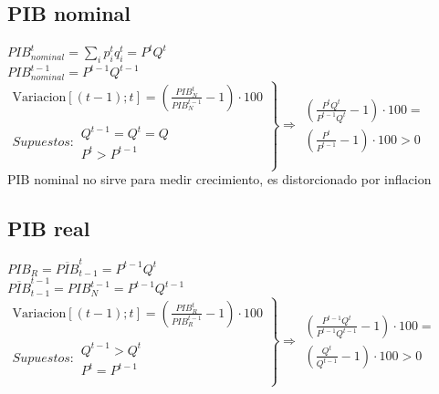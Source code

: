 \documentclass{report}
\begin{document}
\subsection{PIB nominal}
$PIB_{nominal}^t = \sum_{i}{p_i^t q_i^t} = P^t Q^t$ \\

$PIB_{nominal}^{t-1} = P^{t-1}Q^{t-1}$ \\

\(\left.
	\begin{array}{l}
		\text{Variacion}[(t-1);t] = (\frac{PIB_N^t}{PIB_N^{t-1}} - 1) \cdot 100 \\
		Supuestos: \begin{array}{l}           \\
			           Q^{t-1}=Q^t=Q \\
			           P^t > P^{t-1} \\
		           \end{array}
	\end{array}
	\right\} \Rightarrow \begin{array}{l}
		(\frac{P^tQ^t}{P^{t-1}Q^t} - 1)\cdot 100 = \\
		(\frac{P^t}{P^{t-1}} - 1) \cdot 100 > 0
	\end{array}\) \\

PIB nominal no sirve para medir crecimiento, es distorcionado por inflacion

\subsection{PIB real}

$PIB_R = \overline{PIB}_{t-1}^t = P^{t-1}Q^t$ \\

$\overline{PIB}_{t-1}^{t-1} = PIB_N^{t-1} = P^{t-1}Q^{t-1}$ \\

$\left.
	\begin{array}{l}
		\text{Variacion}[(t-1);t] = (\frac{PIB_R^t}{PIB_R^{t-1}} - 1) \cdot 100 \\
		Supuestos: \begin{array}{l}           \\
			           Q^{t-1} > Q^t \\
			           P^t = P^{t-1} \\
		           \end{array}
	\end{array}
	\right\} \Rightarrow \begin{array}{l}
		(\frac{P^{t-1}Q^t}{P^{t-1}Q^{t-1}} - 1)\cdot 100 = \\
		(\frac{Q^t}{Q^{t-1}} - 1) \cdot 100 > 0
	\end{array}$ \\
\end{document}
